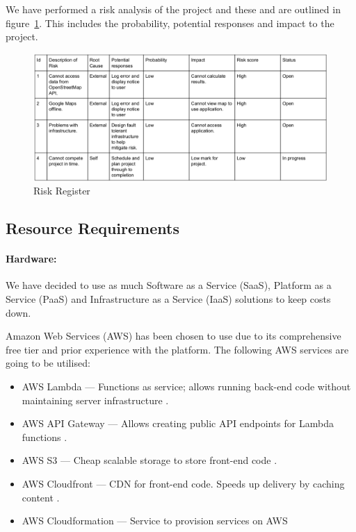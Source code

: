 \documentclass[a4paper,11pt]{article}
\begin{document}
We have performed a risk analysis of the project and these and are outlined in
figure~\ref{fig:risk-register}. This includes the probability, potential
responses and impact to the project.

\begin{figure}[H]
  \includegraphics[width=\textwidth]{risk-register}
  \caption{Risk Register}\label{fig:risk-register}
\end{figure}

\subsection{Resource Requirements}

\paragraph{Hardware:}

We have decided to use as much Software as a Service (SaaS), Platform as a
Service (PaaS) and Infrastructure as a Service (IaaS) solutions to keep costs
down.

Amazon Web Services (AWS) has been chosen to use due to its comprehensive free
tier and prior experience with the platform. The following AWS services are
going to be utilised:

\begin{itemize}
  \item AWS Lambda --- Functions as service; allows running back-end code
    without maintaining server infrastructure \autocite{aws:2}.
  \item AWS API Gateway --- Allows creating public API endpoints for Lambda
    functions \autocite{aws:3}.
  \item AWS S3 --- Cheap scalable storage to store front-end code
    \autocite{aws:4}.
  \item AWS Cloudfront --- CDN for front-end code. Speeds up delivery by caching
    content \autocite{aws:5}.
  \item AWS Cloudformation --- Service to provision services on AWS
    \autocite{aws:6}
\end{itemize}
\end{document}
